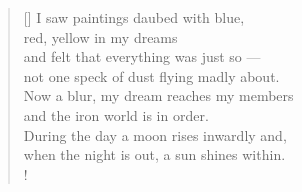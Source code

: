 \documentclass[a4paper,12pt,twoside,final]{book}
\begin{document}

\settowidth{\versewidth}{Now a blur, my dream reaches my members}

\begin{verse}[\versewidth]
  I saw paintings daubed with blue, \\
  red, yellow in my dreams \\
  and felt that everything was just so ---\\
  not one speck of dust flying madly about. \\
  Now a blur, my dream reaches my members \\
  and the iron world is in order. \\
  During the day a moon rises inwardly and, \\
  when the night is out, a sun shines within. \\!
\end{verse}


\newpage

\settowidth{\versewidth}{Nappal hold kél bennem s ha kinn van}
\end{document}
